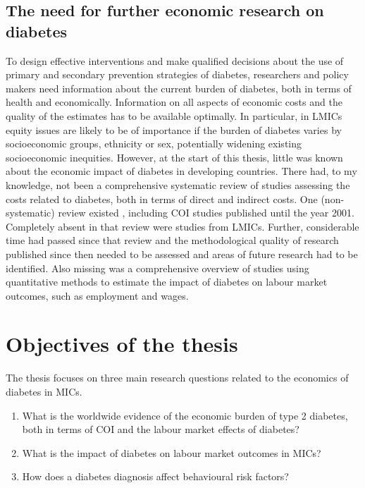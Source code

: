 \subsection{The need for further economic research on diabetes}

To design effective interventions and make qualified decisions about the use of primary and secondary prevention strategies of diabetes, researchers and policy makers need information about the current burden of diabetes, both in terms of health and economically. Information on all aspects of economic costs and the quality of the estimates has to be available optimally. In particular, in \acp{LMIC} equity issues are likely to be of importance if the burden of diabetes varies by socioeconomic groups, ethnicity or sex, potentially widening existing socioeconomic inequities. However, at the start of this thesis, little was known about the economic impact of diabetes in developing countries. There had, to my knowledge, not been a comprehensive systematic review of studies assessing the costs related to diabetes, both in terms of direct and indirect costs. One (non-systematic) review existed \parencite{Ettaro2004}, including \ac{COI} studies published until the year 2001. Completely absent in that review were studies from \acp{LMIC}. Further, considerable time had passed since that review and the methodological quality of research published since then needed to be assessed and areas of future research had to be identified. Also missing was a comprehensive overview of studies using quantitative methods to estimate the impact of diabetes on labour market outcomes, such as employment and wages.



\section{Objectives of the thesis}

The thesis focuses on three main research questions related to the economics of diabetes in \acp{MIC}. 

\begin{enumerate}
\item What is the worldwide evidence of the economic burden of type 2 diabetes, both in terms of \ac{COI} and the labour market effects of diabetes? 

\item What is the impact of diabetes on labour market outcomes in \acp{MIC}?

\item How does a diabetes diagnosis affect behavioural risk factors?

\end{enumerate}

